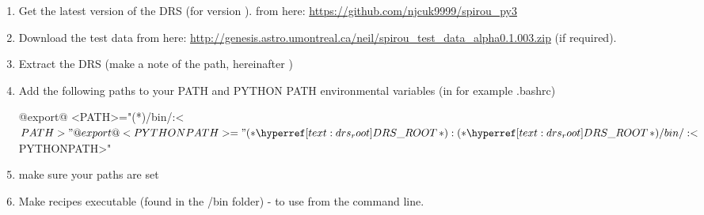 \begin{enumerate}

\item Get the latest version of the DRS (for \instrument version \MyCodeVersion). from here: \url{https://github.com/njcuk9999/spirou_py3}

\item Download the test data from here: \url{http://genesis.astro.umontreal.ca/neil/spirou_test_data_alpha0.1.003.zip} (if required).

\item Extract the DRS (make a note of the path, hereinafter \InstallDIR)

\item Add the following paths to your PATH and PYTHON PATH environmental variables (in for example .bashrc)

	\begin{bashbox}[title={e.g. in $\sim$/.bashrc}]
	@export@ <PATH>="(*\InstallDIR*)/bin/:<$PATH>"
	@export@ <PYTHONPATH>="(*\InstallDIR*):(*\InstallDIR*)/bin/:<$PYTHONPATH>"
	\end{bashbox}

\item make sure your paths are set

\item Make recipes executable (found in the \InstallDIR/bin folder) - to use from the command line.


\end{enumerate}
